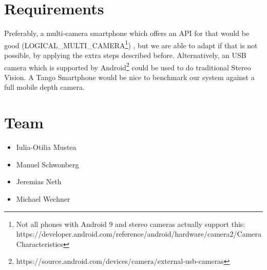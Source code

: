 \documentclass[a4paper,pagesize 10pt]{scrartcl}
\begin{document}
\section{Requirements}
Preferably, a multi-camera smartphone which offers an API for that would be good  (LOGICAL\_MULTI\_CAMERA\footnote{Not all phones with Android 9 and stereo cameras actually support this: https://developer.android.com/reference/android/hardware/camera2/CameraCharacteristics}) , but we are able to adapt if that is not possible, by applying the extra steps described before. Alternatively, an USB camera which is supported by Android\footnote{https://source.android.com/devices/camera/external-usb-cameras} could be used to do traditional Stereo Vision. A Tango Smartphone would be nice to benchmark our system against a full mobile depth camera.
\section{Team}
\begin{itemize}
	\item Iulia-Otilia Mustea
	\item Manuel Schwonberg
	\item Jeremias Neth
	\item Michael Wechner
\end{itemize}


{\small
	
	
}
\end{document}
